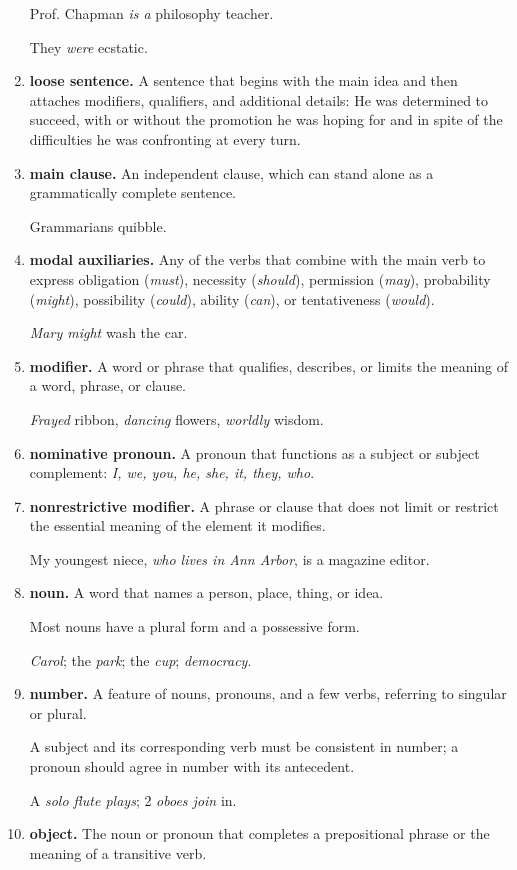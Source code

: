 \documentclass{article}
\begin{document}
\begin{enumerate}
	Prof. Chapman {\it is a} philosophy teacher.
	
	They {\it were} ecstatic.
	\item {\bf loose sentence.} A sentence that begins with the main idea and then attaches modifiers, qualifiers, and additional details: He was determined to succeed, with or without the promotion he was hoping for and in spite of the difficulties he was confronting at every turn.
	\item {\bf main clause.} An independent clause, which can stand alone as a grammatically complete sentence.
	
	Grammarians quibble.
	\item {\bf modal auxiliaries.} Any of the verbs that combine with the main verb to express obligation ({\it must}), necessity ({\it should}), permission ({\it may}), probability ({\it might}), possibility ({\it could}), ability ({\it can}), or tentativeness ({\it would}).
	
	{\it Mary might} wash the car.
	\item {\bf modifier.} A word or phrase that qualifies, describes, or limits the meaning of a word, phrase, or clause.
	
	{\it Frayed} ribbon, {\it dancing} flowers, {\it worldly} wisdom.
	\item {\bf nominative pronoun.} A pronoun that functions as a subject or subject complement: {\it I, we, you, he, she, it, they, who}.
	\item {\bf nonrestrictive modifier.} A phrase or clause that does not limit or restrict the essential meaning of the element it modifies.
	
	My youngest niece, {\it who lives in Ann Arbor}, is a magazine editor.
	\item {\bf noun.} A word that names a person, place, thing, or idea.
	
	Most nouns have a plural form and a possessive form.
	
	{\it Carol}; the {\it park}; the {\it cup}; {\it democracy}.
	\item {\bf number.} A feature of nouns, pronouns, and a few verbs, referring to singular or plural.
	
	A subject and its corresponding verb must be consistent in number; a pronoun should agree in number with its antecedent.
	
	A {\it solo flute plays}; 2 {\it oboes join} in.
	\item {\bf object.} The noun or pronoun that completes a prepositional phrase or the meaning of a transitive verb.
	

\end{enumerate}
\end{document}
